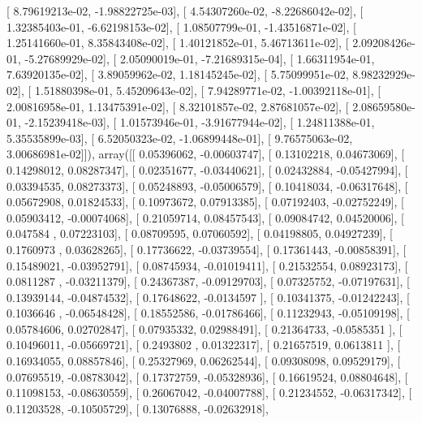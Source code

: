 \documentclass{article}
\begin{document}
       [  8.79619213e-02,  -1.98822725e-03],
       [  4.54307260e-02,  -8.22686042e-02],
       [  1.32385403e-01,  -6.62198153e-02],
       [  1.08507799e-01,  -1.43516871e-02],
       [  1.25141660e-01,   8.35843408e-02],
       [  1.40121852e-01,   5.46713611e-02],
       [  2.09208426e-01,  -5.27689929e-02],
       [  2.05090019e-01,  -7.21689315e-04],
       [  1.66311954e-01,   7.63920135e-02],
       [  3.89059962e-02,   1.18145245e-02],
       [  5.75099951e-02,   8.98232929e-02],
       [  1.51880398e-01,   5.45209643e-02],
       [  7.94289771e-02,  -1.00392118e-01],
       [  2.00816958e-01,   1.13475391e-02],
       [  8.32101857e-02,   2.87681057e-02],
       [  2.08659580e-01,  -2.15239418e-03],
       [  1.01573946e-01,  -3.91677944e-02],
       [  1.24811388e-01,   5.35535899e-03],
       [  6.52050323e-02,  -1.06899448e-01],
       [  9.76575063e-02,   3.00686981e-02]]), array([[ 0.05396062, -0.00603747],
       [ 0.13102218,  0.04673069],
       [ 0.14298012,  0.08287347],
       [ 0.02351677, -0.03440621],
       [ 0.02432884, -0.05427994],
       [ 0.03394535,  0.08273373],
       [ 0.05248893, -0.05006579],
       [ 0.10418034, -0.06317648],
       [ 0.05672908,  0.01824533],
       [ 0.10973672,  0.07913385],
       [ 0.07192403, -0.02752249],
       [ 0.05903412, -0.00074068],
       [ 0.21059714,  0.08457543],
       [ 0.09084742,  0.04520006],
       [ 0.047584  ,  0.07223103],
       [ 0.08709595,  0.07060592],
       [ 0.04198805,  0.04927239],
       [ 0.1760973 ,  0.03628265],
       [ 0.17736622, -0.03739554],
       [ 0.17361443, -0.00858391],
       [ 0.15489021, -0.03952791],
       [ 0.08745934, -0.01019411],
       [ 0.21532554,  0.08923173],
       [ 0.0811287 , -0.03211379],
       [ 0.24367387, -0.09129703],
       [ 0.07325752, -0.07197631],
       [ 0.13939144, -0.04874532],
       [ 0.17648622, -0.0134597 ],
       [ 0.10341375, -0.01242243],
       [ 0.1036646 , -0.06548428],
       [ 0.18552586, -0.01786466],
       [ 0.11232943, -0.05109198],
       [ 0.05784606,  0.02702847],
       [ 0.07935332,  0.02988491],
       [ 0.21364733, -0.0585351 ],
       [ 0.10496011, -0.05669721],
       [ 0.2493802 ,  0.01322317],
       [ 0.21657519,  0.0613811 ],
       [ 0.16934055,  0.08857846],
       [ 0.25327969,  0.06262544],
       [ 0.09308098,  0.09529179],
       [ 0.07695519, -0.08783042],
       [ 0.17372759, -0.05328936],
       [ 0.16619524,  0.08804648],
       [ 0.11098153, -0.08630559],
       [ 0.26067042, -0.04007788],
       [ 0.21234552, -0.06317342],
       [ 0.11203528, -0.10505729],
       [ 0.13076888, -0.02632918],
\end{document}
